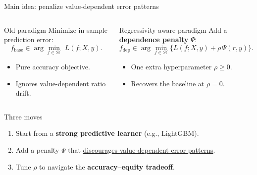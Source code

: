 \documentclass[aspectratio=169,12pt,]{beamer}
\newcommand{\1}{\mathbf{1}}
\renewcommand{\H}{\mathcal{H}}
\begin{document}
\begin{frame}{Main idea: penalize value-dependent error patterns}

\begin{columns}[T,onlytextwidth]
\begin{block}{Old paradigm}
Minimize in-sample prediction error:
\vspace{-1mm}
\[
f_{\text{base}} \in \arg\min_{f\in\H}\; L(f; X, y).
\]
\begin{itemize}
    \item Pure accuracy objective.
    \item {} Ignores value-dependent ratio drift.
\end{itemize}
\end{block}

\begin{block}{Regressivity-aware paradigm}
Add a \textbf{dependence penalty} $\Psi$:
\vspace{-1mm}
\[
f_{\text{dep}} \in \arg\min_{f\in\H}\big\{ L(f; X, y) + \rho\,\Psi(r, y) \big\}.
\]
\begin{itemize}
    \item One extra hyperparameter $\rho \ge 0$.
    \item Recovers the baseline at $\rho=0$.
\end{itemize}
\end{block}
\end{columns}

\vspace{3mm}

\begin{block}{ Three moves}
\begin{enumerate}
    \item Start from a \textbf{strong predictive learner} (e.g., LightGBM).
    \item Add a penalty $\Psi$ that \underline{discourages value-dependent error patterns}.
    \item Tune $\rho$ to navigate the \textbf{accuracy--equity tradeoff}.
\end{enumerate}
\end{block}

\end{frame}
\end{document}
